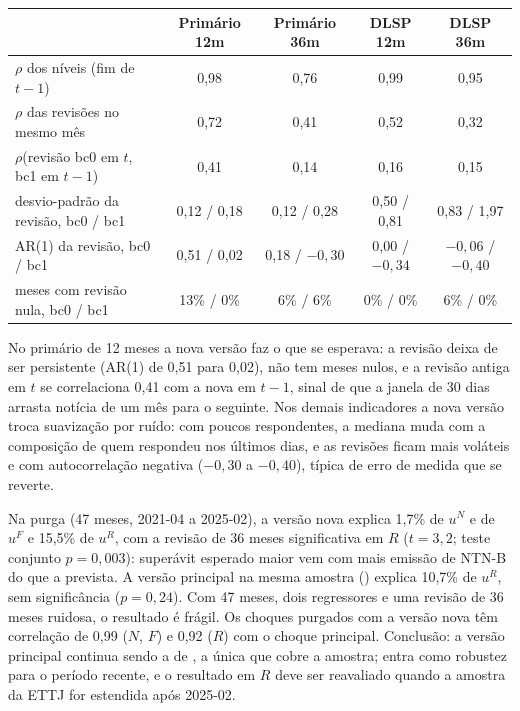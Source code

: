 \documentclass[12pt,a4paper]{article}
\begin{document}
\begin{center}
\footnotesize
\begin{tabular}{lcccc}
\toprule
 & Primário 12m & Primário 36m & DLSP 12m & DLSP 36m \\
\midrule
\(\rho\) dos níveis (fim de \(t-1\)) & 0,98 & 0,76 & 0,99 & 0,95 \\
\(\rho\) das revisões no mesmo mês & 0,72 & 0,41 & 0,52 & 0,32 \\
\(\rho\)(revisão bc0 em \(t\), bc1 em \(t-1\)) & 0,41 & 0,14 & 0,16 & 0,15 \\
desvio-padrão da revisão, bc0 / bc1 & 0,12 / 0,18 & 0,12 / 0,28 & 0,50 / 0,81 & 0,83 / 1,97 \\
AR(1) da revisão, bc0 / bc1 & 0,51 / 0,02 & 0,18 / \(-0{,}30\) & 0,00 / \(-0{,}34\) & \(-0{,}06\) / \(-0{,}40\) \\
meses com revisão nula, bc0 / bc1 & 13\% / 0\% & 6\% / 6\% & 0\% / 0\% & 6\% / 0\% \\
\bottomrule
\end{tabular}
\end{center}

No primário de 12 meses a nova versão faz o que se esperava: a revisão deixa de ser
persistente (AR(1) de 0,51 para 0,02), não tem meses nulos, e a revisão antiga em
\(t\) se correlaciona 0,41 com a nova em \(t-1\), sinal de que a janela de 30 dias
arrasta notícia de um mês para o seguinte. Nos demais indicadores a nova versão troca
suavização por ruído: com poucos respondentes, a mediana muda com a composição de
quem respondeu nos últimos dias, e as revisões ficam mais voláteis e com
autocorrelação negativa (\(-0{,}30\) a \(-0{,}40\)), típica de erro de medida que se
reverte.

Na purga (47 meses, 2021-04 a 2025-02), a versão nova explica 1,7\% de \(u^N\) e de
\(u^F\) e 15,5\% de \(u^R\), com a revisão de 36 meses significativa em \(R\)
(\(t=3{,}2\); teste conjunto \(p=0{,}003\)): superávit esperado maior vem com mais
emissão de NTN-B do que a prevista. A versão principal na mesma amostra
() explica 10,7\% de \(u^R\), sem significância (\(p=0{,}24\)). Com
47 meses, dois regressores e uma revisão de 36 meses ruidosa, o resultado é frágil.
Os choques purgados com a versão nova têm correlação de 0,99 (\(N\), \(F\)) e 0,92
(\(R\)) com o choque principal. Conclusão: a versão principal continua sendo a de
, a única que cobre a amostra;  entra como
robustez para o período recente, e o resultado em \(R\) deve ser reavaliado quando a
amostra da ETTJ for estendida após 2025-02.
\end{document}
